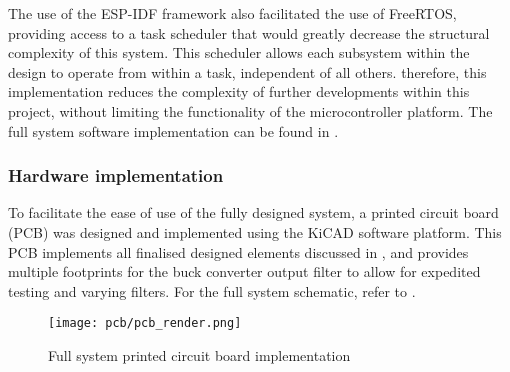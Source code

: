 The use of the ESP-IDF framework also facilitated the use of FreeRTOS, providing access to a task scheduler that would greatly decrease the structural complexity of this system. This scheduler allows each subsystem within the design to operate from within a task, independent of all others. therefore, this implementation reduces the complexity of further developments within this project, without limiting the functionality of the microcontroller platform. The full system software implementation can be found in .


\subsubsection*{Hardware implementation}

To facilitate the ease of use of the fully designed system, a printed circuit board (PCB) was designed and implemented using the KiCAD software platform. This PCB implements all finalised designed elements discussed in , and provides multiple footprints for the buck converter output filter to allow for expedited testing and varying filters. For the full system schematic, refer to .

\begin{figure}[!h]
    \centering
    \texttt{[image: pcb/pcb\_render.png]}
    \caption{Full system printed circuit board implementation}
    \label{F:implemented_pcb}
\end{figure}

